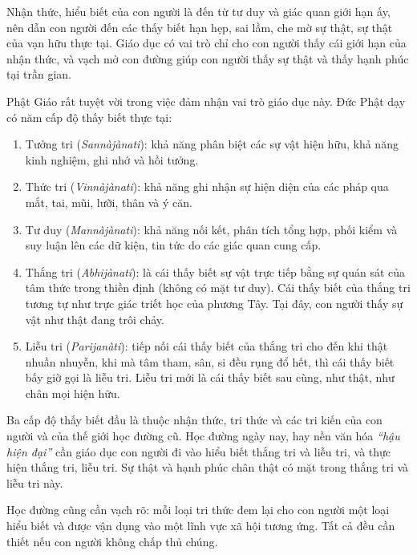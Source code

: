 Nhận thức, hiểu biết của con người là đến từ tư duy và giác quan giới hạn ấy, nên dẫn con người đến các thấy biết hạn hẹp, sai lầm, che mờ sự thật, sự thật của vạn hữu thực tại. Giáo dục có vai trò chỉ cho con người thấy cái giới hạn của nhận thức, và vạch mở con đường giúp con người thấy sự thật và thấy hạnh phúc tại trần gian.

Phật Giáo rất tuyệt vời trong việc đảm nhận vai trò giáo dục này. Đức Phật dạy có năm cấp độ thấy biết thực tại:

\begin{enumerate}[label=\itshape\arabic*\upshape/]
    \item Tưởng tri (\emph{Sannàjànati}): khả năng phân biệt các sự vật hiện hữu, khả năng kinh nghiệm, ghi nhớ và hồi tưởng.

    \item Thức tri (\emph{Vinnàjànati}): khả năng ghi nhận sự hiện diện của các pháp qua mắt, tai, mũi, lưỡi, thân và ý căn.

    \item Tư duy (\emph{Mannàjànati}): khả năng nối kết, phân tích tổng hợp, phối kiểm và suy luận lên các dữ kiện, tin tức do các giác quan cung cấp.

    \item Thắng tri (\emph{Abhijànati}): là cái thấy biết sự vật trực tiếp bằng sự quán sát của tâm thức trong thiền định (không có mặt tư duy). Cái thấy biết của thắng tri tương tự như trực giác triết học của phương Tây. Tại đây, con người thấy sự vật như thật đang trôi chảy.

    \item Liễu tri (\emph{Parijanàti}): tiếp nối cái thấy biết của thắng tri cho đến khi thật nhuần nhuyễn, khi mà tâm tham, sân, si đều rụng đổ hết, thì cái thấy biết bấy giờ gọi là liễu tri. Liễu tri mới là cái thấy biết sau cùng, như thật, như chân mọi hiện hữu.
\end{enumerate}

Ba cấp độ thấy biết đầu là thuộc nhận thức, tri thức và các tri kiến của con người và của thế giới học đường cũ. Học đường ngày nay, hay nền văn hóa \emph{``hậu hiện đại''} cần giáo dục con người đi vào hiểu biết thắng tri và liễu tri, và thực hiện thắng tri, liễu tri. Sự thật và hạnh phúc chân thật có mặt trong thắng tri và liễu tri này.

Học đường cũng cần vạch rõ: mỗi loại tri thức đem lại cho con người một loại hiểu biết và được vận dụng vào một lĩnh vực xã hội tương ứng. Tất cả đều cần thiết nếu con người không chấp thủ chúng.

